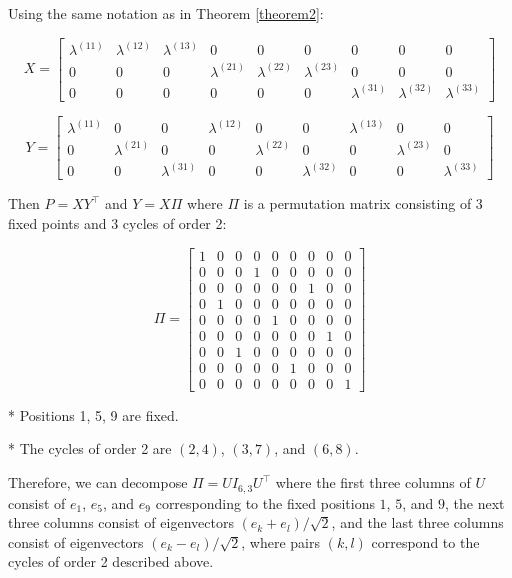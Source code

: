 \documentclass[
  12pt,
]{article}
\begin{document}
\begin{example}[$K = 3$] Using the same notation as in Theorem \ref{theorem2}:

$$X = \begin{bmatrix} 
\lambda^{(11)} & \lambda^{(12)} & \lambda^{(13)} & 0 & 0 & 0 & 0 & 0 & 0 \\
0 & 0 & 0 & \lambda^{(21)} & \lambda^{(22)} & \lambda^{(23)} & 0 & 0 & 0 \\
0 & 0 & 0 & 0 & 0 & 0 & \lambda^{(31)} & \lambda^{(32)} & \lambda^{(33)}
\end{bmatrix}$$

$$Y = \begin{bmatrix} 
\lambda^{(11)} & 0 & 0 & \lambda^{(12)} & 0 & 0 & \lambda^{(13)} & 0 & 0 \\
0 & \lambda^{(21)} & 0 & 0 & \lambda^{(22)} & 0 & 0 & \lambda^{(23)} & 0 \\
0 & 0 & \lambda^{(31)} & 0 & 0 & \lambda^{(32)} & 0 & 0 & \lambda^{(33)}
\end{bmatrix}$$

Then $P = X Y^\top$ and $Y = X \Pi$ where $\Pi$ is a permutation matrix 
consisting of $3$ fixed points and $3$ cycles of order 2:

$$\Pi = \begin{bmatrix} 
1 & 0 & 0 & 0 & 0 & 0 & 0 & 0 & 0 \\
0 & 0 & 0 & 1 & 0 & 0 & 0 & 0 & 0 \\
0 & 0 & 0 & 0 & 0 & 0 & 1 & 0 & 0 \\
0 & 1 & 0 & 0 & 0 & 0 & 0 & 0 & 0 \\
0 & 0 & 0 & 0 & 1 & 0 & 0 & 0 & 0 \\
0 & 0 & 0 & 0 & 0 & 0 & 0 & 1 & 0 \\
0 & 0 & 1 & 0 & 0 & 0 & 0 & 0 & 0 \\
0 & 0 & 0 & 0 & 0 & 1 & 0 & 0 & 0 \\
0 & 0 & 0 & 0 & 0 & 0 & 0 & 0 & 1
\end{bmatrix}$$

* Positions 1, 5, 9 are fixed.

* The cycles of order 2 are $(2, 4)$, $(3, 7)$, and $(6, 8)$.
    
Therefore, we can decompose $\Pi = U I_{6, 3} U^\top$ where the first three 
columns of $U$ consist of $e_1$, $e_5$, and $e_9$ corresponding to the fixed 
positions $1$, $5$, and $9$, the next three columns consist of eigenvectors 
$(e_k + e_l) / \sqrt{2}$, and the last three columns consist of eigenvectors 
$(e_k - e_l) / \sqrt{2}$, where pairs $(k, l)$ correspond to the cycles of 
order 2 described above.


\end{example}
\end{document}
